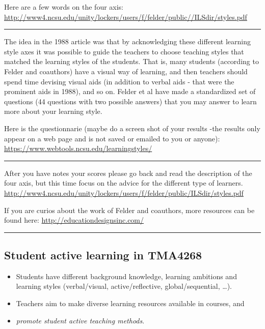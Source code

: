 \documentclass[]{article}
\providecommand{\tightlist}{%
  \setlength{\itemsep}{0pt}\setlength{\parskip}{0pt}}
\begin{document}
Here are a few words on the four axis:
\url{http://www4.ncsu.edu/unity/lockers/users/f/felder/public//ILSdir/styles.pdf}

\begin{center}\rule{0.5\linewidth}{\linethickness}\end{center}

The idea in the 1988 article was that by acknowledging these different
learning style axes it was possible to guide the teachers to choose
teaching styles that matched the learning styles of the students. That
is, many students (according to Felder and coauthors) have a visual way
of learning, and then teachers should spend time devising visual aids
(in addition to verbal aids - that were the prominent aids in 1988), and
so on. Felder et al have made a standardized set of questions (44
questions with two possible answers) that you may answer to learn more
about your learning style.

Here is the questionnarie (maybe do a screen shot of your results -the
results only appear on a web page and is not saved or emailed to you or
anyone): \url{https://www.webtools.ncsu.edu/learningstyles/}

\begin{center}\rule{0.5\linewidth}{\linethickness}\end{center}

After you have notes your scores please go back and read the description
of the four axis, but this time focus on the advice for the different
type of learners.
\url{http://www4.ncsu.edu/unity/lockers/users/f/felder/public/ILSdir/styles.pdf}

If you are curios about the work of Felder and coauthors, more resources
can be found here: \url{http://educationdesignsinc.com/}

\begin{center}\rule{0.5\linewidth}{\linethickness}\end{center}

\hypertarget{student-active-learning-in-tma4268}{%
\subsection{Student active learning in
TMA4268}\label{student-active-learning-in-tma4268}}

\begin{itemize}
\tightlist
\item
  Students have different background knowledge, learning ambitions and
  learning styles (verbal/visual, active/reflective, global/sequential,
  \ldots{}).
\item
  Teachers aim to make diverse learning resources available in courses,
  and
\item
  \emph{promote student active teaching methods}.
\end{itemize}
\end{document}
